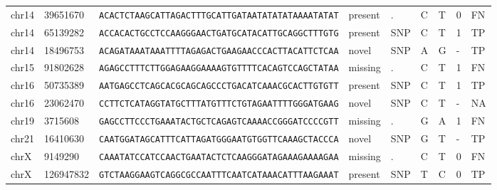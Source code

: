 \begin{landscape}
\begin{table}[]
\begin{tabular}{@{}lllllllll@{}}
chr14 & 39651670  & \texttt{ACACTCTAAGCATTAGACTTTGCATTGATAATATATATAAAATATAT} & present            & .         & C        & T                   & 0         & FN     \\
chr14 & 65139282  & \texttt{ACCACACTGCCTCCAAGGGAACTGATGCATACATTGCAGGCTTTGTG} & present            & SNP       & C        & T                   & 1         & TP     \\
chr14 & 18496753  & \texttt{ACAGATAAATAAATTTTAGAGACTGAAGAACCCACTTACATTCTCAA} & novel              & SNP       & A        & G                   & -         & TP     \\
chr15 & 91802628  & \texttt{AGAGCCTTTCTTGGAGAAGGAAAAGTGTTTTCACAGTCCAGCTATAA} & missing            & .         & C        & T                   & 1         & FN     \\
chr16 & 50735389  & \texttt{AATGAGCCTCAGCACGCAGCAGCCCTGACATCAAACGCACTTGTGTT} & present            & SNP       & C        & T                   & 1         & TP     \\
chr16 & 23062470  & \texttt{CCTTCTCATAGGTATGCTTTATGTTTCTGTAGAATTTTGGGATGAAG} & novel              & SNP       & C        & T                   & -         & NA     \\
chr19 & 3715608   & \texttt{GAGCCTTCCCTGAAATACTGCTCAGAGTCAAAACCGGGATCCCCGTT} & missing            & .         & G        & A                   & 1         & FN     \\
chr21 & 16410630  & \texttt{CAATGGATAGCATTTCATTAGATGGGAATGTGGTTCAAAGCTACCCA} & novel              & SNP       & G        & T                   & -         & TP     \\
chrX  & 9149290   & \texttt{CAAATATCCATCCAACTGAATACTCTCAAGGGATAGAAAGAAAAGAA} & missing            & .         & C        & T                   & 0         & FN     \\
chrX  & 126947832 & \texttt{GTCTAAGGAAGTCAGGCGCCAATTTCAATCATAAACATTTAAGAAAT} & present            & SNP       & T        & C                   & 0         & TP     \\ \bottomrule
\end{tabular}
\end{table}
\end{landscape}

